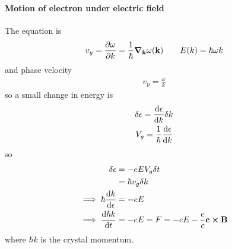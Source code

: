 \documentclass[../main.tex]{subfiles}
\begin{document}
\paragraph*{Motion of electron under electric field} The equation is
\begin{align*}
    v_g = \pdv{\omega}{k} = \frac{1}{\hbar} \grad_{\vb k} \omega (\vb k) \qquad E(k) = \hbar \omega k
\end{align*}
and phase velocity
\begin{align*}
    v_p = \frac{\omega}{k} 
\end{align*}
so a small change in energy is
\begin{align*}
    \delta \epsilon = \dv{\epsilon}{k} \delta k \\
    V_g = \frac{1}{\hbar} \dv{\epsilon}{k}
\end{align*}
so
\begin{align*}
    \delta \epsilon &= - e E V_g \delta t \\
    &= \hbar v_g \delta k \\
    \implies \hbar \dv{k}{\epsilon} &= -e E \\
    \implies \dv{\hbar k}{t} &= -e E = F = -e E - \frac{e}{c} \vb c \cross \vb B
\end{align*}
where $\hbar k$ is the crystal momentum. 
\end{document}

